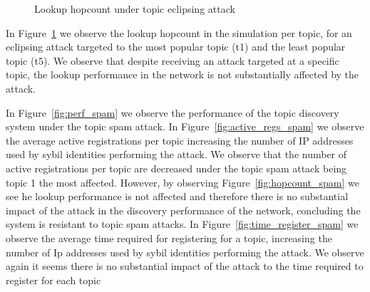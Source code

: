 \begin{figure}[!h]
\centering
{} 
\hspace{-0.16cm}
 \caption{Lookup hopcount under topic eclipsing attack} 
\label{fig:lookup_eclipse}
\vspace{-0.15in}
\end{figure}   


In Figure~\ref{fig:lookup_eclipse} we observe the lookup hopcount in the simulation per topic,  for an eclipsing attack targeted to the most popular topic (t1) and the least popular topic (t5).
We observe that despite receiving an attack targeted at a specific topic,  the lookup performance in the network is not substantially affected by the attack.

In Figure~\ref{fig:perf_spam} we observe the performance of the topic discovery system under  the topic spam attack.
In Figure~\ref{fig:active_regs_spam} we observe the average active registrations per topic increasing the number of IP addresses used by sybil identities performing the attack.  
We observe that the number of active registrations per topic are decreased under the topic spam attack being topic 1 the most affected.
However, by observing Figure~\ref{fig:hopcount_spam} we see he lookup performance is not affected and therefore there is no substantial impact of the attack in the discovery performance of the network, concluding the system is resistant to topic spam attacks.
In Figure~\ref{fig:time_register_spam} we observe the average time required for registering for a topic,  increasing the number of Ip addresses used by sybil identities performing the attack.  
We observe again it seems there is no substantial impact of the attack to the time required to register for each topic

